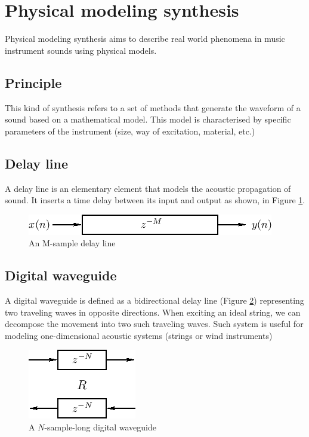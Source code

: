\documentclass[11pt,a4paper]{article}
\begin{document}
\section{Physical modeling synthesis}

Physical modeling synthesis aims to describe real world phenomena in music instrument sounds using physical models.\cite{pasp}

\subsection*{Principle}
This kind of synthesis refers to a set of methods that generate the waveform of a sound based on a mathematical model. This model is characterised by specific parameters of the instrument (size, way of excitation, material, etc.)

\subsection*{Delay line}
A delay line is an elementary element that models the acoustic propagation of sound. It inserts a time delay between its input and output as shown, in Figure \ref{fig:delayline}.
\begin{figure}[h]
	\centering
	\includegraphics[scale=0.5]{pictures/delayline.png}
	\caption{An M-sample delay line}
	\label{fig:delayline}
\end{figure}

\subsection*{Digital waveguide}
A digital waveguide is defined as a bidirectional delay line (Figure \ref{fig:waveguide}) representing two traveling waves in opposite directions. When exciting an ideal string, we can decompose the movement into two such traveling waves. Such system is useful for modeling one-dimensional acoustic systems (strings or wind instruments)
\begin{figure}
	\centering
	\includegraphics[scale=0.5]{pictures/waveguide.png}
	\caption{A $N$-sample-long digital waveguide }
	\label{fig:waveguide}
\end{figure}
\end{document}
